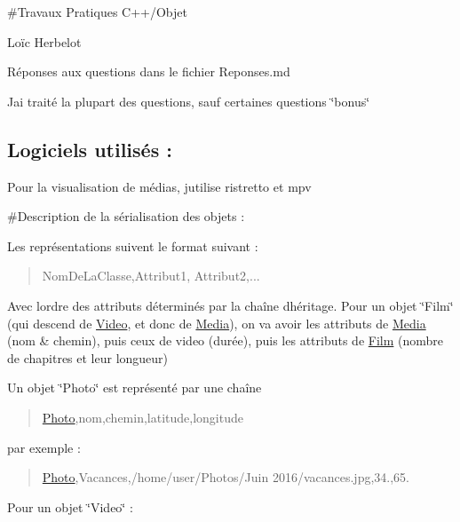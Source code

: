 \#\+Travaux Pratiques C++/\+Objet

Loïc Herbelot

Réponses aux questions dans le fichier Reponses.\+md

J\textquotesingle{}ai traité la plupart des questions, sauf certaines questions \char`\"{}bonus\char`\"{}

\subsection*{Logiciels utilisés \+:}

Pour la visualisation de médias, j\textquotesingle{}utilise {\ttfamily ristretto} et {\ttfamily mpv}

\#\+Description de la sérialisation des objets \+:

Les représentations suivent le format suivant \+:

\begin{quote}
Nom\+De\+La\+Classe,Attribut1, Attribut2,... \end{quote}


Avec l\textquotesingle{}ordre des attributs déterminés par la chaîne d\textquotesingle{}héritage. Pour un objet \char`\"{}\+Film\char`\"{} (qui descend de \hyperlink{classVideo}{Video}, et donc de \hyperlink{classMedia}{Media}), on va avoir les attributs de \hyperlink{classMedia}{Media} (nom \& chemin), puis ceux de video (durée), puis les attributs de \hyperlink{classFilm}{Film} (nombre de chapitres et leur longueur)


\begin{DoxyItemize}
\item Un objet \char`\"{}\+Photo\char`\"{} est représenté par une chaîne
\end{DoxyItemize}

\begin{quote}
\hyperlink{classPhoto}{Photo},nom,chemin,latitude,longitude \end{quote}


par exemple \+:

\begin{quote}
\hyperlink{classPhoto}{Photo},Vacances,/home/user/\+Photos/\+Juin 2016/vacances.\+jpg,34.,65. \end{quote}



\begin{DoxyItemize}
\item Pour un objet \char`\"{}\+Video\char`\"{} \+:
\end{DoxyItemize}

